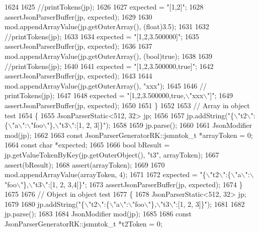 \begin{DoxyCode}
{{{{{{{{{{{{{{{{{{{{{1624 
1625         \textcolor{comment}{//printTokens(jp);}
1626 
1627         expected = \textcolor{stringliteral}{"[1,2]"};
1628         assertJsonParserBuffer(jp, expected);
1629 
1630         mod.appendArrayValue(jp.getOuterArray(), (float)3.5);
1631 
1632         \textcolor{comment}{//printTokens(jp);}
1633 
1634         expected = \textcolor{stringliteral}{"[1,2,3.500000]"};
1635         assertJsonParserBuffer(jp, expected);
1636 
1637         mod.appendArrayValue(jp.getOuterArray(), (bool)\textcolor{keyword}{true});
1638 
1639         \textcolor{comment}{//printTokens(jp);}
1640 
1641         expected = \textcolor{stringliteral}{"[1,2,3.500000,true]"};
1642         assertJsonParserBuffer(jp, expected);
1643 
1644         mod.appendArrayValue(jp.getOuterArray(), \textcolor{stringliteral}{"xxx"});
1645 
1646         \textcolor{comment}{// printTokens(jp);}
1647 
1648         expected = \textcolor{stringliteral}{"[1,2,3.500000,true,\(\backslash\)"xxx\(\backslash\)"]"};
1649         assertJsonParserBuffer(jp, expected);
1650 
1651     \}
1652 
1653     \textcolor{comment}{// Array in object test}
1654     \{
1655         JsonParserStatic<512, 32> jp;
1656 
1657         jp.addString(\textcolor{stringliteral}{"\{\(\backslash\)"t2\(\backslash\)":\{\(\backslash\)"a\(\backslash\)":\(\backslash\)"foo\(\backslash\)"\},\(\backslash\)"t3\(\backslash\)":[1, 2, 3]\}"});
1658 
1659         jp.parse();
1660 
1661         JsonModifier mod(jp);
1662 
1663         \textcolor{keyword}{const} JsonParserGeneratorRK::jsmntok_t *arrayToken = 0;
1664         \textcolor{keyword}{const} \textcolor{keywordtype}{char} *expected;
1665 
1666         \textcolor{keywordtype}{bool} bResult = jp.getValueTokenByKey(jp.getOuterObject(), \textcolor{stringliteral}{"t3"}, arrayToken);
1667         assert(bResult);
1668         assert(arrayToken);
1669 
1670         mod.appendArrayValue(arrayToken, 4);
1671 
1672         expected = \textcolor{stringliteral}{"\{\(\backslash\)"t2\(\backslash\)":\{\(\backslash\)"a\(\backslash\)":\(\backslash\)"foo\(\backslash\)"\},\(\backslash\)"t3\(\backslash\)":[1, 2, 3,4]\}"};
1673         assertJsonParserBuffer(jp, expected);
1674     \}
1675 
1676     \textcolor{comment}{// Object in object test}
1677     \{
1678         JsonParserStatic<512, 32> jp;
1679 
1680         jp.addString(\textcolor{stringliteral}{"\{\(\backslash\)"t2\(\backslash\)":\{\(\backslash\)"a\(\backslash\)":\(\backslash\)"foo\(\backslash\)"\},\(\backslash\)"t3\(\backslash\)":[1, 2, 3]\}"});
1681 
1682         jp.parse();
1683 
1684         JsonModifier mod(jp);
1685 
1686         \textcolor{keyword}{const} JsonParserGeneratorRK::jsmntok_t *t2Token = 0;
}}}}}}}}}}}}}}}}}}}}}
\end{DoxyCode}
